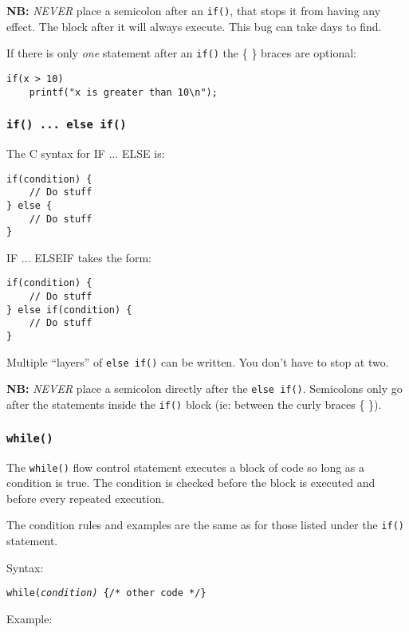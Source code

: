 \documentclass{lab}
\begin{document}
\begin{multicols}{2}
\textbf{NB:} \textit{NEVER} place a semicolon after an \texttt{if()}, that stops it from having any effect. The block after it will always execute. This bug can take days to find.

If there is only \textit{one} statement after an \texttt{if()} the \{ \} braces are optional:

\begin{lstlisting}[style=CStyle]
if(x > 10) 
	printf("x is greater than 10\n");
\end{lstlisting}


\subsubsection{\texttt{if() ... else if()}}

The C syntax for IF ... ELSE is:

\begin{lstlisting}[style=CStyle]
if(condition) {
	// Do stuff
} else {
	// Do stuff
}
\end{lstlisting}

IF ... ELSEIF takes the form:

\begin{lstlisting}[style=CStyle]
if(condition) {
	// Do stuff
} else if(condition) {
	// Do stuff
}
\end{lstlisting}

Multiple ``layers'' of \texttt{else if()} can be written. You don't have to stop at two.

\textbf{NB:} \textit{NEVER} place a semicolon directly after  the \texttt{else if()}. Semicolons only go after the statements inside the \texttt{if()} block (ie: between the curly braces \{ \}).

\columnbreak
\subsubsection{\texttt{while()}}

The \texttt{while()} flow control statement executes a block of code so long as a condition is true. The condition is checked before the block is executed and before every repeated execution.

The condition rules and examples are the same as for those listed under the \texttt{if()} statement.

Syntax:

\texttt{while(\textit{condition)} \{/* other code */\}}

Example:


\end{multicols}
\end{document}
